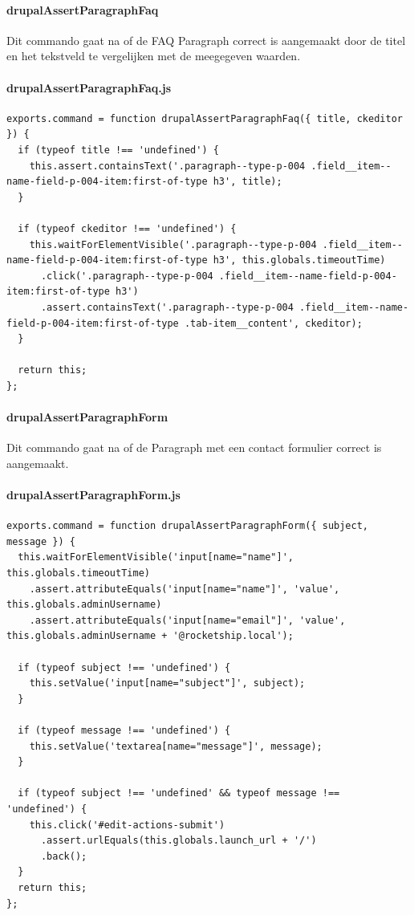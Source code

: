 \clearpage
\paragraph{drupalAssertParagraphFaq}
\label{commando3}
Dit commando gaat na of de FAQ Paragraph correct is aangemaakt door de titel en het tekstveld te vergelijken met de meegegeven waarden.
\paragraph{drupalAssertParagraphFaq.js}
\begin{lstlisting}[breaklines=true]
exports.command = function drupalAssertParagraphFaq({ title, ckeditor }) {
  if (typeof title !== 'undefined') {
    this.assert.containsText('.paragraph--type-p-004 .field__item--name-field-p-004-item:first-of-type h3', title);
  }

  if (typeof ckeditor !== 'undefined') {
    this.waitForElementVisible('.paragraph--type-p-004 .field__item--name-field-p-004-item:first-of-type h3', this.globals.timeoutTime)
      .click('.paragraph--type-p-004 .field__item--name-field-p-004-item:first-of-type h3')
      .assert.containsText('.paragraph--type-p-004 .field__item--name-field-p-004-item:first-of-type .tab-item__content', ckeditor);
  }

  return this;
};
\end{lstlisting}


\clearpage
\paragraph{drupalAssertParagraphForm}
\label{commando4}
Dit commando gaat na of de Paragraph met een contact formulier correct is aangemaakt.
\paragraph{drupalAssertParagraphForm.js}
\begin{lstlisting}[breaklines=true]
exports.command = function drupalAssertParagraphForm({ subject, message }) {
  this.waitForElementVisible('input[name="name"]', this.globals.timeoutTime)
    .assert.attributeEquals('input[name="name"]', 'value', this.globals.adminUsername)
    .assert.attributeEquals('input[name="email"]', 'value', this.globals.adminUsername + '@rocketship.local');

  if (typeof subject !== 'undefined') {
    this.setValue('input[name="subject"]', subject);
  }

  if (typeof message !== 'undefined') {
    this.setValue('textarea[name="message"]', message);
  }

  if (typeof subject !== 'undefined' && typeof message !== 'undefined') {
    this.click('#edit-actions-submit')
      .assert.urlEquals(this.globals.launch_url + '/')
      .back();
  }
  return this;
};
\end{lstlisting}



